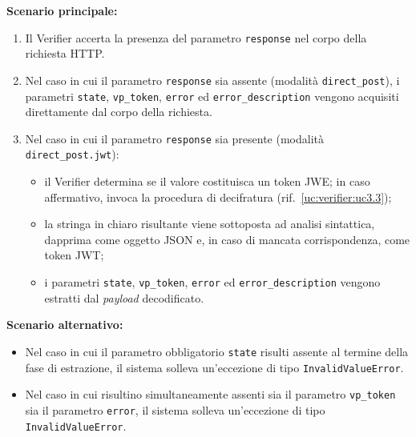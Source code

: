 \noindent\textbf{Scenario principale:}
\begin{enumerate}
    \item Il Verifier accerta la presenza del parametro \texttt{response} nel corpo della richiesta HTTP.
    \item Nel caso in cui il parametro \texttt{response} sia assente (modalità \texttt{direct\_\allowbreak{}post}), i parametri \texttt{state}, \texttt{vp\_\allowbreak{}token}, \texttt{error} ed \texttt{error\_\allowbreak{}description} vengono acquisiti direttamente dal corpo della richiesta.
    \item Nel caso in cui il parametro \texttt{response} sia presente (modalità \texttt{direct\_\allowbreak{}post.jwt}):
    \begin{itemize}
        \item il Verifier determina se il valore costituisca un token JWE; in caso affermativo, invoca la procedura di decifratura (rif.\ \ref{uc:verifier:uc3.3});
        \item la stringa in chiaro risultante viene sottoposta ad analisi sintattica, dapprima come oggetto JSON e, in caso di mancata corrispondenza, come token JWT;
        \item i parametri \texttt{state}, \texttt{vp\_\allowbreak{}token}, \texttt{error} ed \texttt{error\_\allowbreak{}description} vengono estratti dal \textit{payload} decodificato.
    \end{itemize}
\end{enumerate}

\noindent\textbf{Scenario alternativo:}
\begin{itemize}
    \item Nel caso in cui il parametro obbligatorio \texttt{state} risulti assente al termine della fase di estrazione, il sistema solleva un'eccezione di tipo \texttt{InvalidValueError}.
    \item Nel caso in cui risultino simultaneamente assenti sia il parametro \texttt{vp\_\allowbreak{}token} sia il parametro \texttt{error}, il sistema solleva un'eccezione di tipo \texttt{InvalidValueError}.
\end{itemize}

